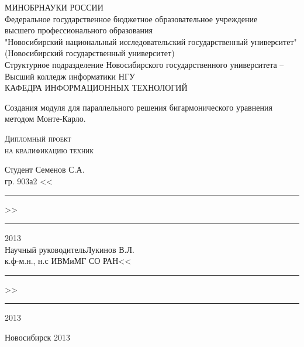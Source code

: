 \begin{titlepage}
\begin{small}
\begin{center}
МИНОБРНАУКИ РОССИИ\\
Федеральное государственное бюджетное образовательное учреждение\\
высшего профессионального образования \\
"Новосибирский национальный исследовательский государственный университет"\\
(Новосибирский государственный университет)\\
Структурное подразделение Новосибирского государственного университета -- \\
Высший колледж информатики НГУ\\
КАФЕДРА ИНФОРМАЦИОННЫХ ТЕХНОЛОГИЙ
\end{center}
\end{small}

\vspace{8em}

\begin{center}
\Large Создания модуля для параллельного решения бигармонического уравнения методом Монте-Карло. 
\end{center}

\vspace{2.5em}

\begin{center}
\textsc{Дипломный проект\\ на квалификацию техник }
\end{center}

\vspace{6em}

\begin{flushleft}
 Студент \hfill Семенов С.А. \\
гр. 903а2 \hfill <<\rule{3ex}{0,1mm}>>\rule{10ex}{0,1mm}2013 \\
\vspace{1.5em}
Научный руководитель\hfill Лукинов В.Л.\\
к.ф-м.н., н.с ИВМиМГ СО РАН\hfill <<\rule{3ex}{0,1mm}>>\rule{10ex}{0,1mm}2013 \\
\end{flushleft}

\vspace{\fill}
\begin{center}
Новосибирск 2013
\end{center}
\end{titlepage}

